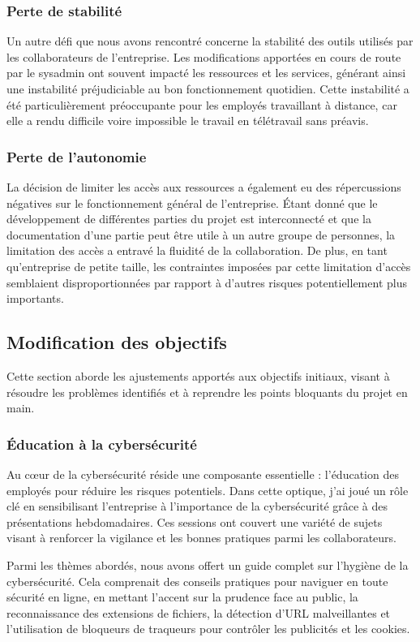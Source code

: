 \subsubsection{Perte de stabilité}
Un autre défi que nous avons rencontré concerne la stabilité des outils utilisés par les collaborateurs de l'entreprise.
Les modifications apportées en cours de route par le sysadmin ont souvent impacté les ressources et les services, générant ainsi une instabilité préjudiciable au bon fonctionnement quotidien.
Cette instabilité a été particulièrement préoccupante pour les employés travaillant à distance, car elle a rendu difficile voire impossible le travail en télétravail sans préavis.

\subsubsection{Perte de l'autonomie}
La décision de limiter les accès aux ressources a également eu des répercussions négatives sur le fonctionnement général de l'entreprise.
Étant donné que le développement de différentes parties du projet est interconnecté et que la documentation d'une partie peut être utile à un autre groupe de personnes, la limitation des accès a entravé la fluidité de la collaboration.
De plus, en tant qu'entreprise de petite taille, les contraintes imposées par cette limitation d'accès semblaient disproportionnées par rapport à d'autres risques potentiellement plus importants.


\subsection{Modification des objectifs}
Cette section aborde les ajustements apportés aux objectifs initiaux, visant à résoudre les problèmes identifiés et à reprendre les points bloquants du projet en main.

\subsubsection{Éducation à la cybersécurité}
Au cœur de la cybersécurité réside une composante essentielle : l'éducation des employés pour réduire les risques potentiels.
Dans cette optique, j'ai joué un rôle clé en sensibilisant l'entreprise à l'importance de la cybersécurité grâce à des présentations hebdomadaires.
Ces sessions ont couvert une variété de sujets visant à renforcer la vigilance et les bonnes pratiques parmi les collaborateurs.

Parmi les thèmes abordés, nous avons offert un guide complet sur l'hygiène de la cybersécurité.
Cela comprenait des conseils pratiques pour naviguer en toute sécurité en ligne, en mettant l'accent sur la prudence face au public, la reconnaissance des extensions de fichiers, la détection d'URL malveillantes et l'utilisation de bloqueurs de traqueurs pour contrôler les publicités et les cookies.

